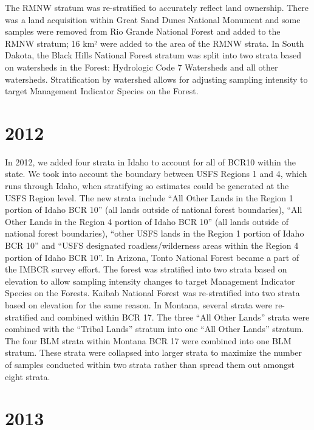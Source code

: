 \documentclass[
  letterpaper,
  DIV=11,
  numbers=noendperiod,
  oneside]{scrreprt}
\begin{document}
The RMNW stratum was re-stratified to accurately reflect land ownership.
There was a land acquisition within Great Sand Dunes National Monument
and some samples were removed from Rio Grande National Forest and added
to the RMNW stratum; 16 km² were added to the area of the RMNW strata.
In South Dakota, the Black Hills National Forest stratum was split into
two strata based on watersheds in the Forest: Hydrologic Code 7
Watersheds and all other watersheds. Stratification by watershed allows
for adjusting sampling intensity to target Management Indicator Species
on the Forest.

\hypertarget{section-3}{%
\section*{\texorpdfstring{\textbf{2012}}{2012}}\label{section-3}}


In 2012, we added four strata in Idaho to account for all of BCR10
within the state. We took into account the boundary between USFS Regions
1 and 4, which runs through Idaho, when stratifying so estimates could
be generated at the USFS Region level. The new strata include ``All
Other Lands in the Region 1 portion of Idaho BCR 10'' (all lands outside
of national forest boundaries), ``All Other Lands in the Region 4
portion of Idaho BCR 10'' (all lands outside of national forest
boundaries), ``other USFS lands in the Region 1 portion of Idaho BCR
10'' and ``USFS designated roadless/wilderness areas within the Region 4
portion of Idaho BCR 10''. In Arizona, Tonto National Forest became a
part of the IMBCR survey effort. The forest was stratified into two
strata based on elevation to allow sampling intensity changes to target
Management Indicator Species on the Forests. Kaibab National Forest was
re-stratified into two strata based on elevation for the same reason. In
Montana, several strata were re-stratified and combined within BCR 17.
The three ``All Other Lands'' strata were combined with the ``Tribal
Lands'' stratum into one ``All Other Lands'' stratum. The four BLM
strata within Montana BCR 17 were combined into one BLM stratum. These
strata were collapsed into larger strata to maximize the number of
samples conducted within two strata rather than spread them out amongst
eight strata.

\hypertarget{section-4}{%
\section*{\texorpdfstring{\textbf{2013}}{2013}}\label{section-4}}
\end{document}
